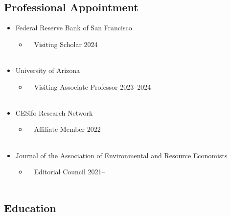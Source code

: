 \documentclass[12pt]{res} %
\begin{document}
\begin{resume}
\subsection{Professional Appointment}
	\begin{itemize} \itemsep -12pt
		\item[] Federal Reserve Bank of San Francisco
		\vspace{-0.05in} 
		\begin{itemize}
			\item[] \,\,\,\, Visiting Scholar \hfill 2024\\\
		\end{itemize}
		\vspace{-0.05in}
		\item[] University of Arizona
		\vspace{-0.05in} 
		\begin{itemize}
			\item[] \,\,\,\, Visiting Associate Professor \hfill 2023--2024\\\
		\end{itemize}
		\vspace{-0.05in}
		\item[] CESifo Research Network 
		\vspace{-0.05in} 
		\begin{itemize}
			\item[] \,\,\,\, Affiliate Member \hfill 2022--\\\
		\end{itemize}
		\vspace{-0.05in}
		\item[] Journal of the Association of Environmental and Resource Economists 
		\vspace{-0.05in} 
		\begin{itemize}
			\item[] \,\,\,\, Editorial Council \hfill 2021--\\\
		\end{itemize}
	\end{itemize}
\vspace{-0.5in}
\subsection{Education}



\end{resume}
\end{document}

